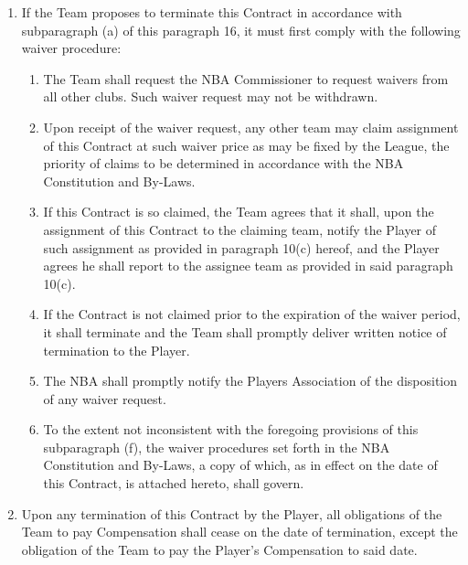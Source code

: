 \documentclass[
]{book}
\providecommand{\tightlist}{%
  \setlength{\itemsep}{0pt}\setlength{\parskip}{0pt}}
\begin{document}
\begin{enumerate}
\item
  If the Team proposes to terminate this Contract in accordance with subparagraph (a) of this paragraph 16, it must first comply with the following waiver procedure:

  \begin{enumerate}
  \def\labelenumii{(\roman{enumii})}
  \tightlist
  \item
    The Team shall request the NBA Commissioner to request waivers from all other clubs. Such waiver request may not be withdrawn.
  \item
    Upon receipt of the waiver request, any other team may claim assignment of this Contract at such waiver price as may be fixed by the League, the priority of claims to be determined in accordance with the NBA Constitution and By-Laws.
  \item
    If this Contract is so claimed, the Team agrees that it shall, upon the assignment of this Contract to the claiming team, notify the Player of such assignment as provided in paragraph 10(c) hereof, and the Player agrees he shall report to the assignee team as provided in said paragraph 10(c).
  \item
    If the Contract is not claimed prior to the expiration of the waiver period, it shall terminate and the Team shall promptly deliver written notice of termination to the Player.
  \item
    The NBA shall promptly notify the Players Association of the disposition of any waiver request.
  \item
    To the extent not inconsistent with the foregoing provisions of this subparagraph (f), the waiver procedures set forth in the NBA Constitution and By-Laws, a copy of which, as in effect on the date of this Contract, is attached hereto, shall govern.
  \end{enumerate}
\item
  Upon any termination of this Contract by the Player, all obligations of the Team to pay Compensation shall cease on the date of termination, except the obligation of the Team to pay the Player's Compensation to said date.
\end{enumerate}
\end{document}
